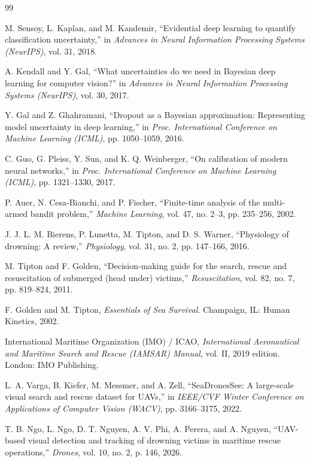 \documentclass[11pt,a4paper]{article}
\begin{document}
\begin{thebibliography}{99}

M. Sensoy, L. Kaplan, and M. Kandemir,
``Evidential deep learning to quantify classification uncertainty,''
in \textit{Advances in Neural Information Processing Systems (NeurIPS)},
vol. 31, 2018.

A. Kendall and Y. Gal,
``What uncertainties do we need in Bayesian deep learning for computer vision?''
in \textit{Advances in Neural Information Processing Systems (NeurIPS)},
vol. 30, 2017.

Y. Gal and Z. Ghahramani,
``Dropout as a Bayesian approximation: Representing model uncertainty in
deep learning,''
in \textit{Proc. International Conference on Machine Learning (ICML)},
pp. 1050--1059, 2016.

C. Guo, G. Pleiss, Y. Sun, and K. Q. Weinberger,
``On calibration of modern neural networks,''
in \textit{Proc. International Conference on Machine Learning (ICML)},
pp. 1321--1330, 2017.

P. Auer, N. Cesa-Bianchi, and P. Fischer,
``Finite-time analysis of the multi-armed bandit problem,''
\textit{Machine Learning}, vol. 47, no. 2--3, pp. 235--256, 2002.

J. J. L. M. Bierens, P. Lunetta, M. Tipton, and D. S. Warner,
``Physiology of drowning: A review,''
\textit{Physiology}, vol. 31, no. 2, pp. 147--166, 2016.

M. Tipton and F. Golden,
``Decision-making guide for the search, rescue and resuscitation of
submerged (head under) victims,''
\textit{Resuscitation}, vol. 82, no. 7, pp. 819--824, 2011.

F. Golden and M. Tipton,
\textit{Essentials of Sea Survival}.
Champaign, IL: Human Kinetics, 2002.

International Maritime Organization (IMO) / ICAO,
\textit{International Aeronautical and Maritime Search and Rescue (IAMSAR)
Manual}, vol. II, 2019 edition.
London: IMO Publishing.

L. A. Varga, B. Kiefer, M. Messmer, and A. Zell,
``SeaDronesSee: A large-scale visual search and rescue dataset for UAVs,''
in \textit{IEEE/CVF Winter Conference on Applications of Computer Vision
(WACV)}, pp. 3166--3175, 2022.

T. B. Ngo, L. Ngo, D. T. Nguyen, A. V. Phi, A. Perera, and A. Nguyen,
``UAV-based visual detection and tracking of drowning victims in maritime
rescue operations,''
\textit{Drones}, vol. 10, no. 2, p. 146, 2026.


\end{thebibliography}
\end{document}
